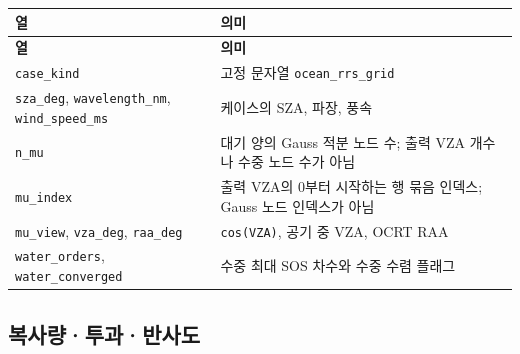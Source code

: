 {\TableFont
\begin{longtable}{@{}>{\raggedright\arraybackslash}p{}>{\raggedright\arraybackslash}p{}@{}}
\toprule
\textbf{열} & \textbf{의미} \\
\midrule
\endfirsthead
\toprule
\textbf{열} & \textbf{의미} \\
\midrule
\endhead
\bottomrule
\endfoot
\texttt{case\_\allowbreak{}kind} & 고정 문자열 \texttt{ocean\_\allowbreak{}rrs\_\allowbreak{}grid} \\
\texttt{sza\_\allowbreak{}deg}, \texttt{wavelength\_\allowbreak{}nm}, \texttt{wind\_\allowbreak{}speed\_\allowbreak{}ms} & 케이스의 SZA, 파장, 풍속 \\
\texttt{n\_\allowbreak{}mu} & 대기 양의 Gauss 적분 노드 수; 출력 VZA 개수나 수중 노드 수가 아님 \\
\texttt{mu\_\allowbreak{}index} & 출력 VZA의 0부터 시작하는 행 묶음 인덱스; Gauss 노드 인덱스가 아님 \\
\texttt{mu\_\allowbreak{}view}, \texttt{vza\_\allowbreak{}deg}, \texttt{raa\_\allowbreak{}deg} & \texttt{cos(VZA)}, 공기 중 VZA, OCRT RAA \\
\texttt{water\_\allowbreak{}orders}, \texttt{water\_\allowbreak{}converged} & 수중 최대 SOS 차수와 수중 수렴 플래그 \\
\end{longtable}
}

\subsection{복사량·투과·반사도}
\label{sec:auto:05_output_formats:7.2}

